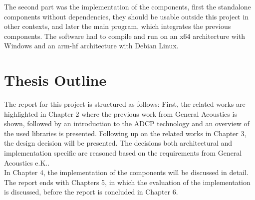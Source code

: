 The second part was the implementation of the components, first the standalone components without dependencies, they should be usable outside this project in other contexts, and later the main program, which integrates the previous components. The software had to compile and run on an x64 architecture with Windows and an arm-hf architecture with Debian Linux.

\section{Thesis Outline}
The report for this project is structured as follows: First, the related works are highlighted in Chapter 2 where the previous work from General Acoustics is shown, followed by an introduction to the ADCP technology and an overview of the used libraries is presented. Following up on the related works in Chapter 3, the design decision will be presented. The decisions both architectural and implementation specific are reasoned based on the requirements from General Acoustics e.K..\\ 
In Chapter 4, the implementation of the components will be discussed in detail. The report ends with Chapters 5, in which the evaluation of the implementation is discussed, before the report is concluded in Chapter 6.
